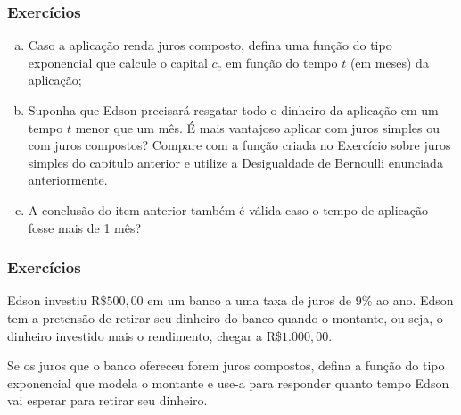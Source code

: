
\begin{frame}
\frametitle{Exercícios}

    \begin{enumerate}[(a)]
        \item Caso a aplicação renda juros composto, defina uma função do tipo exponencial que calcule o capital $c_c$ em função do tempo $t$ (em meses) da aplicação;
        \item Suponha que Edson precisará resgatar todo o dinheiro da aplicação em um tempo $t$ menor que um mês. É mais vantajoso aplicar com juros simples ou com juros compostos? Compare com a função criada no Exercício sobre juros simples do capítulo anterior e utilize a Desigualdade de Bernoulli enunciada anteriormente.
        \item A conclusão do item anterior também é válida caso o tempo de aplicação fosse mais de 1 mês?
	\end{enumerate}


\end{frame}



\begin{frame}
\frametitle{Exercícios}

\begin{exercise}
    Edson investiu R\$$500{,}00$ em um banco a uma taxa de juros de 9\% ao ano. Edson tem a pretensão de retirar seu dinheiro do banco quando o montante, ou seja, o dinheiro investido mais o rendimento, chegar a R\$$1.000{,}00$.

Se os juros que o banco ofereceu forem juros compostos, defina a função do tipo exponencial que modela o montante e use-a para responder quanto tempo Edson vai esperar para retirar seu dinheiro.
\end{exercise}

\end{frame}




